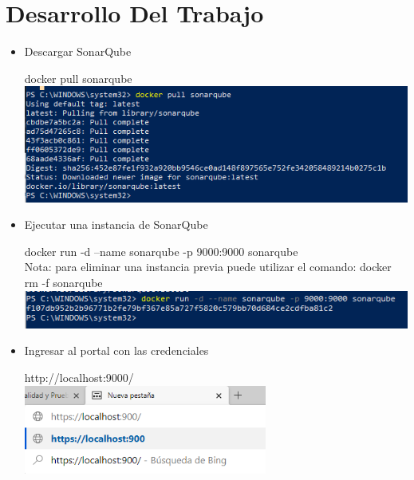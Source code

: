 \documentclass[preprint,12pt]{elsarticle}
\begin{document}
\section{Desarrollo Del Trabajo}	
\begin{itemize}
	\item Descargar SonarQube
	\begin{center}
		docker pull sonarqube \\
		\includegraphics[width=15cm]{./imagen/descargasonarqube}
	\end{center}
	\item Ejecutar una instancia de SonarQube
	\begin{center}
	docker run -d --name sonarqube -p 9000:9000 sonarqube \\
	Nota: para eliminar una instancia previa puede utilizar el comando: docker rm -f sonarqube \\
	\includegraphics[width=15cm]{./imagen/instanciasonarqube}
	\end{center}
	\item Ingresar al portal con las credenciales
	\begin{center}
	http://localhost:9000/ \\
	\includegraphics[width=8cm]{./imagen/urlportal}

\end{center}
\end{itemize}
\end{document}
